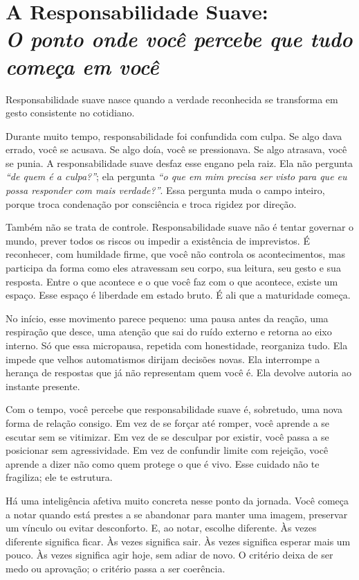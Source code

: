 \documentclass[12pt]{book}
\begin{document}
\chapter[A Responsabilidade Suave: O ponto onde você percebe que tudo começa em você]{A Responsabilidade Suave:\\[0.4ex]\large\itshape O ponto onde você percebe que tudo começa em você}

Responsabilidade suave nasce quando a verdade reconhecida se transforma em gesto consistente no cotidiano.

Durante muito tempo, responsabilidade foi confundida com culpa. Se algo dava errado, você se acusava. Se algo doía, você se pressionava. Se algo atrasava, você se punia. A responsabilidade suave desfaz esse engano pela raiz. Ela não pergunta \textit{“de quem é a culpa?”}; ela pergunta \textit{“o que em mim precisa ser visto para que eu possa responder com mais verdade?”}. Essa pergunta muda o campo inteiro, porque troca condenação por consciência e troca rigidez por direção.

Também não se trata de controle. Responsabilidade suave não é tentar governar o mundo, prever todos os riscos ou impedir a existência de imprevistos. É reconhecer, com humildade firme, que você não controla os acontecimentos, mas participa da forma como eles atravessam seu corpo, sua leitura, seu gesto e sua resposta. Entre o que acontece e o que você faz com o que acontece, existe um espaço. Esse espaço é liberdade em estado bruto. É ali que a maturidade começa.

No início, esse movimento parece pequeno: uma pausa antes da reação, uma respiração que desce, uma atenção que sai do ruído externo e retorna ao eixo interno. Só que essa micropausa, repetida com honestidade, reorganiza tudo. Ela impede que velhos automatismos dirijam decisões novas. Ela interrompe a herança de respostas que já não representam quem você é. Ela devolve autoria ao instante presente.

Com o tempo, você percebe que responsabilidade suave é, sobretudo, uma nova forma de relação consigo. Em vez de se forçar até romper, você aprende a se escutar sem se vitimizar. Em vez de se desculpar por existir, você passa a se posicionar sem agressividade. Em vez de confundir limite com rejeição, você aprende a dizer não como quem protege o que é vivo. Esse cuidado não te fragiliza; ele te estrutura.

Há uma inteligência afetiva muito concreta nesse ponto da jornada. Você começa a notar quando está prestes a se abandonar para manter uma imagem, preservar um vínculo ou evitar desconforto. E, ao notar, escolhe diferente. Às vezes diferente significa ficar. Às vezes significa sair. Às vezes significa esperar mais um pouco. Às vezes significa agir hoje, sem adiar de novo. O critério deixa de ser medo ou aprovação; o critério passa a ser coerência.
\end{document}
